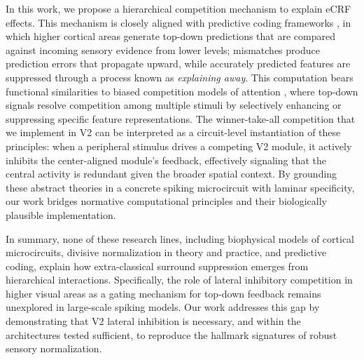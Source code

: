 %
In this work, we propose a hierarchical competition mechanism to explain eCRF effects. This mechanism is closely aligned with predictive coding frameworks \citep{Rao1999, Friston2005}, in which higher cortical areas generate top-down predictions that are compared against incoming sensory evidence from lower levels; mismatches produce prediction errors that propagate upward, while accurately predicted features are suppressed through a process known as \emph{explaining away}. This computation bears functional similarities to biased competition models of attention \citep{Desimone1995,Reynolds1999}, where top-down signals resolve competition among multiple stimuli by selectively enhancing or suppressing specific feature representations. The winner-take-all competition that we implement in V2 can be interpreted as a circuit-level instantiation of these principles: when a peripheral stimulus drives a competing V2 module, it actively inhibits the center-aligned module's feedback, effectively signaling that the central activity is redundant given the broader spatial context. By grounding these abstract theories in a concrete spiking microcircuit with laminar specificity, our work bridges normative computational principles and their biologically plausible implementation.

%
In summary, none of these research lines, including biophysical models of cortical microcircuits, divisive normalization in theory and practice, and predictive coding, explain how extra-classical surround suppression emerges from hierarchical interactions. Specifically, the role of lateral inhibitory competition in higher visual areas as a gating mechanism for top-down feedback remains unexplored in large-scale spiking models. Our work addresses this gap by demonstrating that V2 lateral inhibition is necessary, and within the architectures tested sufficient, to reproduce the hallmark signatures of robust sensory normalization.